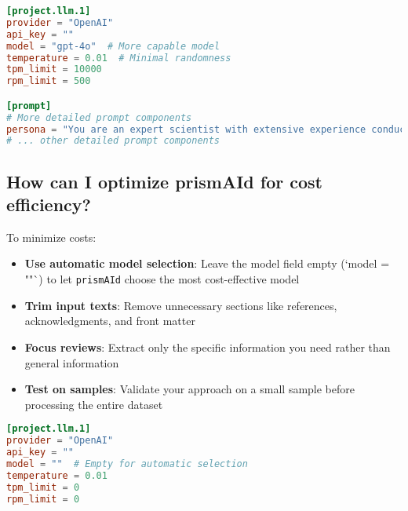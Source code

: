\begin{configbox}
\begin{lstlisting}[language=TOML]
[project.llm.1]
provider = "OpenAI"
api_key = ""
model = "gpt-4o"  # More capable model
temperature = 0.01  # Minimal randomness
tpm_limit = 10000
rpm_limit = 500

[prompt]
# More detailed prompt components
persona = "You are an expert scientist with extensive experience conducting systematic reviews following PRISMA guidelines. You have specific expertise in identifying methodological details and extracting precise information from scientific papers."
# ... other detailed prompt components
\end{lstlisting}
\end{configbox}

\subsection{How can I optimize prismAId for cost efficiency?}

To minimize costs:

\begin{itemize}
    \item \textbf{Use automatic model selection}: Leave the model field empty (`model = ""`) to let \texttt{prismAId} choose the most cost-effective model
    \item \textbf{Trim input texts}: Remove unnecessary sections like references, acknowledgments, and front matter
    \item \textbf{Focus reviews}: Extract only the specific information you need rather than general information
    \item \textbf{Test on samples}: Validate your approach on a small sample before processing the entire dataset
\end{itemize}

\begin{configbox}
\begin{lstlisting}[language=TOML]
[project.llm.1]
provider = "OpenAI"
api_key = ""
model = ""  # Empty for automatic selection
temperature = 0.01
tpm_limit = 0
rpm_limit = 0
\end{lstlisting}
\end{configbox}


